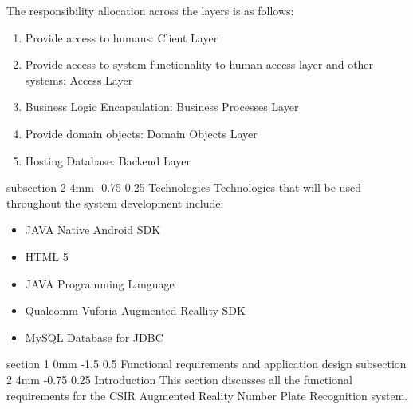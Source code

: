 \documentclass[12pt]{article}
\makeatletter
\renewcommand{\section}{\@startsection
   {section}%
   {1}%
   {0mm}%
   {-1.5\baselineskip}%
   {0.5\baselineskip}%
   {\sffamily\bfseries\upshape\normalsize}}%
\renewcommand{\subsection}{\@startsection
   {subsection}%
   {2}%
   {4mm}%
   {-0.75\baselineskip}%
   {0.25\baselineskip}%
   {\rmfamily\normalfont\scshape\normalsize}}%
\makeatother
\begin{document}
                			
                			The responsibility allocation across the layers is as follows:
                			\begin{enumerate}
                					\item Provide access to humans: Client Layer
                					\item Provide access to system functionality to human access layer and other systems: Access Layer
                					\item Business Logic Encapsulation: Business Processes Layer
                					\item Provide domain objects: Domain Objects Layer
                					\item Hosting Database: Backend Layer
                			\end{enumerate}
                			
					\subsection{Technologies}
							Technologies that will be used throughout the system development include:
							\begin{itemize}
								\item JAVA Native Android SDK
								\item HTML 5
								\item JAVA Programming Language
								\item Qualcomm Vuforia Augmented Reallity SDK
								\item MySQL Database for JDBC
							\end{itemize}
                    
                \section{Functional requirements and application design}
                    \subsection{Introduction}
                    This section discusses all the functional requirements for the CSIR Augmented Reality Number Plate Recognition system.
                    
\end{document}
